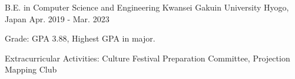 

\begin{cventries}

  \cventry
    {B.E. in Computer Science and Engineering} %
    {Kwansei Gakuin University} %
    {Hyogo, Japan} %
    {Apr. 2019 - Mar. 2023} %
    {
      \begin{cvitems} %
        \item {Grade: GPA 3.88, Highest GPA in major.}
        \item {Extracurricular Activities: Culture Festival Preparation Committee, Projection Mapping Club}
      \end{cvitems}
    }

\end{cventries}
